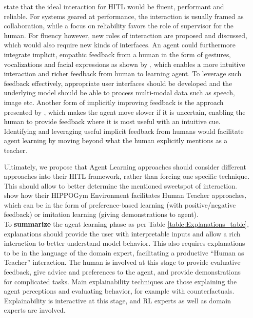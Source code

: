 \documentclass[twoside,11pt]{article}
\begin{document}
\citet{WuEtAl:2021:HITLMLSurvey} state that the ideal interaction for HITL would be fluent, performant and reliable. For systems geared at performance, the interaction is usually framed as collaboration, while a focus on reliability favors the role of supervisor for the human. For fluency however, new roles of interaction are proposed and discussed, which would also require new kinds of interfaces. An agent could furthermore integrate implicit, empathic feedback from a human in the form of gestures, vocalizations and facial expressions as shown by \citet{CuiEtAl:2020:EMPATHICFrameworkHumanFeedback}, which enables a more intuitive interaction and richer feedback from human to learning agent. To leverage such feedback effectively, appropriate user interfaces should be developed and the underlying model should be able to process multi-modal data such as speech, image etc. Another form of implicitly improving feedback is the approach presented by \citet{PengEtAl:2016:AdaptingAgentSpeed}, which makes the agent move slower if it is uncertain, enabling the human to provide feedback where it is most useful with an intuitive cue. Identifying and leveraging useful implicit feedback from humans would facilitate agent learning by moving beyond what the human explicitly mentions as a teacher.

Ultimately, we propose that Agent Learning approaches should consider different approaches into their HITL framework, rather than forcing one specific technique. This should allow to better determine the mentioned sweetspot of interaction. \citet{WuEtAl:2021:HITLMLSurvey} show how their HIPPOGym Environment facilitates Human Teacher approaches, which can be in the form of preference-based learning (with positive/negative feedback) or imitation learning (giving demonstrations to agent).\\




\noindent To \textbf{summarize} the agent learning phase as per Table \ref{table:Explanations_table}, explanations should provide the user with interpretable inputs and allow a rich interaction to better understand model behavior. This also requires explanations to be in the language of the domain expert, facilitating a productive ``Human as Teacher'' interaction. The human is involved at this stage to provide evaluative feedback, give advice and preferences to the agent, and provide demonstrations for complicated tasks. Main explainability techniques are those explaining the agent perceptions and evaluating behavior, for example with counterfactuals. Explainability is interactive at this stage, and RL experts as well as domain experts are involved.
\end{document}
